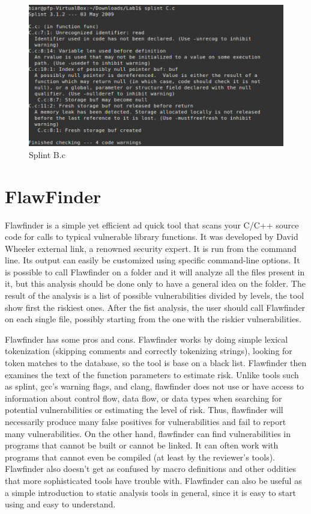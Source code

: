\documentclass[a4paper]{article}
\begin{document}
\begin{figure}[h!]
    \centering
    \includegraphics[width=0.6\linewidth]{screen-C}
    \caption{Splint B.c}
\end{figure}

\section*{FlawFinder}

Flawfinder is a simple yet efficient ad quick tool that scans your C/C++ source 
code for calls to typical vulnerable library functions. It was developed by 
David Wheeler external link, a renowned security expert. It is run from the 
command line. Its output can easily be customized using specific command-line options. 
It is possible to call Flawfinder on a folder and it will analyze all the files
present in it, but this analysis should be done only to have a general idea on the folder.
The result of the analysis is a list of possible vulnerabilities divided by levels, the tool
show first the riskiest ones.
After the fist analysis, the user should call Flawfinder on each single file, possibly starting 
from the one with the riskier vulnerabilities.

Flawfinder has some pros and cons. Flawfinder works by doing simple
lexical tokenization (skipping comments and correctly tokenizing strings), 
looking for token matches to the
database, so the tool is base on a black list. 
Flawfinder then examines the text of the function parameters to estimate risk.
Unlike tools such as splint, gcc’s warning flags, and clang, 
flawfinder does not use or have access to information
about control flow, data flow, or data types when searching 
for potential vulnerabilities or estimating
the level of risk. Thus, flawfinder will necessarily produce many 
false positives for vulnerabilities and fail
to report many vulnerabilities. On the other hand, 
flawfinder can find vulnerabilities in programs that cannot
be built or cannot be linked. It can often work with programs 
that cannot even be compiled (at least by
the reviewer’s tools). Flawfinder also doesn’t get as confused 
by macro definitions and other oddities that
more sophisticated tools have trouble with. Flawfinder can 
also be useful as a simple introduction to static
analysis tools in general, since it is easy to start using and easy to understand.
\end{document}
